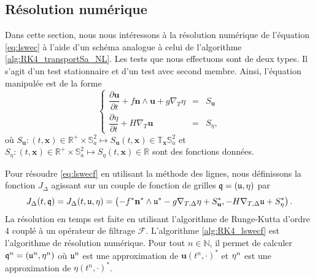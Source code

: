











\subsection{Résolution numérique}

Dans cette section, nous nous intéressons à la résolution numérique de l'équation \eqref{eq:lswec} à l'aide d'un schéma analogue à celui de l'algorithme \ref{alg:RK4_transportSa_NL}. Les tests que nous effectuons sont de deux types. Il s'agit d'un test stationnaire et d'un test avec second membre. Ainsi, l'équation manipulée est de la forme
\begin{equation}
\left\lbrace
\begin{array}{rcl}
\dfrac{\partial \mathbf{u}}{\partial t} + f \mathbf{n} \wedge \mathbf{u} + g \nabla_T \eta & = & S_{\mathbf{u}} \\
\dfrac{\partial \eta}{\partial t} +  H \nabla_T \mathbf{u} & = & S_{\eta},
\end{array}
\right.
\label{eq:lswecf}
\end{equation}
où $S_{\mathbf{u}} : (t,\mathbf{x}) \in \mathbb{R}^+ \times \mathbb{S}_a^2 \mapsto S_{\mathbf{u}}(t,\mathbf{x}) \in \mathbb{T}_{\mathbf{x}} \mathbb{S}_a^2$ et $S_{\eta} : (t,\mathbf{x}) \in \mathbb{R}^+ \times \mathbb{S}_a^2 \mapsto S_{\eta}(t,\mathbf{x}) \in \mathbb{R}$ sont des fonctions données.

Pour résoudre \eqref{eq:lswecf} en utilisant la méthode des lignes, nous définissons la fonction $J_{\Delta}$ agissant sur un couple de fonction de grilles $\mathfrak{q}=(\mathfrak{u},\mathbf{\eta})$ par 
\begin{equation}
J_{\Delta}(t,\mathfrak{q}) = J_{\Delta}(t,\mathfrak{u},\mathbf{\eta}) = \left( - f^* \mathbf{n}^* \wedge \mathfrak{u}^* - g \nabla_{T,\Delta} \mathbf{\eta} + S^*_{\mathbf{u}} , - H \nabla_{T,\Delta} \mathfrak{u} + S^*_{\eta} \right).
\end{equation}
La résolution en temps est faite en utilisant l'algorithme de Runge-Kutta d'ordre 4 couplé à un opérateur de filtrage $\mathcal{F}$. L'algorithme \ref{alg:RK4_lswecf} est l'algorithme de résolution numérique. Pour tout $n \in \mathbb{N}$, il permet de calculer $\mathfrak{q}^n = (\mathfrak{u}^n , \mathbf{\eta}^n)$ où $\mathfrak{u}^n$ est une approximation de $\mathbf{u}(t^n,\cdot)^*$ et $\mathbf{\eta}^n$ est une approximation de $\eta(t^n,\cdot)^*$.

